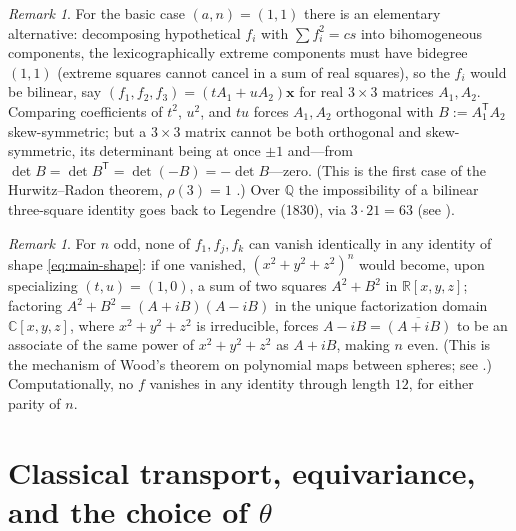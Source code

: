 \documentclass[11pt]{article}
\theoremstyle{definition}
\theoremstyle{remark}
\newtheorem{remark}[theorem]{Remark}
\newcommand{\RR}{\mathbb{R}}
\newcommand{\CC}{\mathbb{C}}
\begin{document}
\begin{remark}
For the basic case $(a,n)=(1,1)$ there is an elementary alternative: decomposing hypothetical $f_i$ with $\sum f_i^2=cs$ into bihomogeneous components, the lexicographically extreme components must have bidegree $(1,1)$ (extreme squares cannot cancel in a sum of real squares), so the $f_i$ would be bilinear, say $(f_1,f_2,f_3)=(tA_1+uA_2)\mathbf{x}$ for real $3\times3$ matrices $A_1,A_2$. Comparing coefficients of $t^2$, $u^2$, and $tu$ forces $A_1,A_2$ orthogonal with $B:=A_1^{\mathsf T}A_2$ skew-symmetric; but a $3\times3$ matrix cannot be both orthogonal and skew-symmetric, its determinant being at once $\pm1$ and---from $\det B=\det B^{\mathsf T}=\det(-B)=-\det B$---zero. (This is the first case of the Hurwitz--Radon theorem, $\rho(3)=1$ \cite[Ch.~0, pp.~3--4]{ShapiroBook}.) Over $\mathbb{Q}$ the impossibility of a bilinear three-square identity goes back to Legendre (1830), via $3\cdot21=63$ (see \cite[Ch.~0]{ShapiroBook}).
\end{remark}

\begin{remark}\label{rem:nondegen}
For $n$ odd, none of $f_1,f_j,f_k$ can vanish identically in any identity of shape \eqref{eq:main-shape}: if one vanished, $(x^2+y^2+z^2)^{n}$ would become, upon specializing $(t,u)=(1,0)$, a sum of two squares $A^2+B^2$ in $\RR[x,y,z]$; factoring $A^2+B^2=(A+iB)(A-iB)$ in the unique factorization domain $\CC[x,y,z]$, where $x^2+y^2+z^2$ is irreducible, forces $A-iB=\overline{(A+iB)}$ to be an associate of the same power of $x^2+y^2+z^2$ as $A+iB$, making $n$ even. (This is the mechanism of Wood's theorem on polynomial maps between spheres; see \cite[Ch.~15, Appendix]{ShapiroBook}.) Computationally, no $f$ vanishes in any identity through length $12$, for either parity of $n$.
\end{remark}

\section{Classical transport, equivariance, and the choice of $\theta$}\label{sec:transport}
\end{document}
